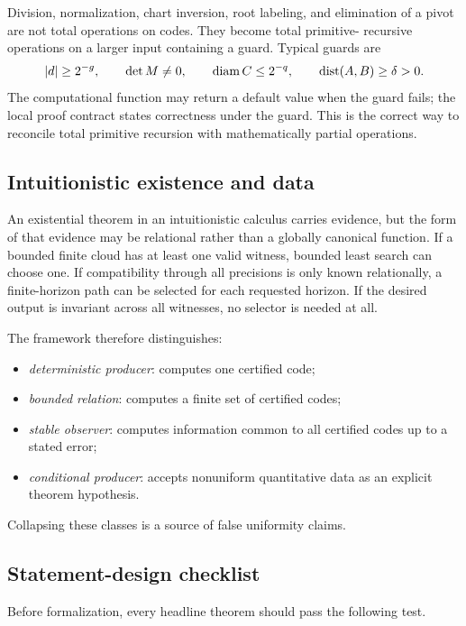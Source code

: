 Division, normalization, chart inversion, root labeling, and elimination of a
pivot are not total operations on codes.  They become total primitive-
recursive operations on a larger input containing a guard.  Typical guards are
\[
   |d|\ge 2^{-g},\qquad \det M\ne0,\qquad
   \operatorname{diam} C\le 2^{-q},\qquad \operatorname{dist}(A,B)\ge\delta>0.
\]
The computational function may return a default value when the guard fails;
the local proof contract states correctness under the guard.  This is the
correct way to reconcile total primitive recursion with mathematically partial
operations.

\subsection{Intuitionistic existence and data}

An existential theorem in an intuitionistic calculus carries evidence, but the
form of that evidence may be relational rather than a globally canonical
function.  If a bounded finite cloud has at least one valid witness, bounded
least search can choose one.  If compatibility through all precisions is only
known relationally, a finite-horizon path can be selected for each requested
horizon.  If the desired output is invariant across all witnesses, no selector
is needed at all.

The framework therefore distinguishes:

\begin{itemize}
\item \emph{deterministic producer}: computes one certified code;
\item \emph{bounded relation}: computes a finite set of certified codes;
\item \emph{stable observer}: computes information common to all certified
codes up to a stated error;
\item \emph{conditional producer}: accepts nonuniform quantitative data as an
explicit theorem hypothesis.
\end{itemize}

Collapsing these classes is a source of false uniformity claims.

\subsection{Statement-design checklist}

Before formalization, every headline theorem should pass the following test.

